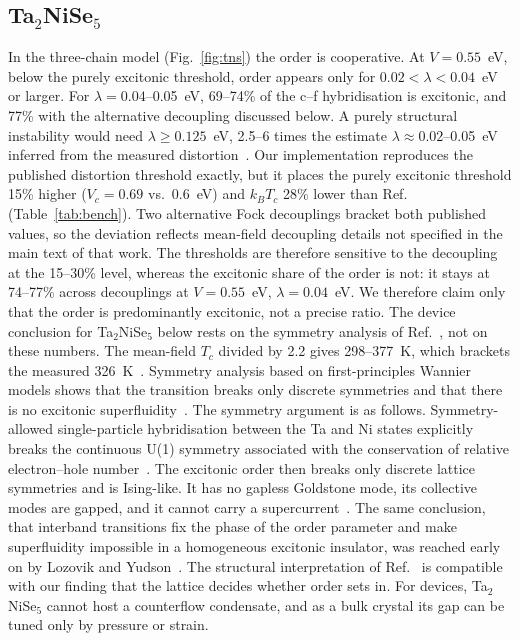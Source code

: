 \documentclass[aip,jap,reprint,amsmath,amssymb]{revtex4-2}
\begin{document}
\subsection{Ta$_2$NiSe$_5$}
In the three-chain model (Fig.~\ref{fig:tns}) the order is cooperative. At $V=0.55$~eV, below the purely excitonic threshold, order appears only for $0.02<\lambda<0.04$~eV or larger. For $\lambda=0.04$--0.05~eV, 69--74\% of the c--f hybridisation is excitonic, and 77\% with the alternative decoupling discussed below. A purely
structural instability would need $\lambda\ge0.125$~eV, 2.5--6 times the estimate $\lambda\approx0.02$--0.05~eV inferred from the measured
distortion~\cite{Kaneko2013}. Our implementation reproduces the published distortion threshold exactly, but it places the purely excitonic threshold 15\% higher ($V_c=0.69$ vs.\ 0.6~eV) and $k_BT_c$ 28\% lower than Ref.~ (Table~\ref{tab:bench}). Two alternative Fock decouplings bracket both published values, so the deviation reflects mean-field decoupling details not specified in the main text of that work. The thresholds are therefore sensitive to the decoupling at the 15--30\% level, whereas the excitonic share of the order is not: it stays at 74--77\% across decouplings at $V=0.55$~eV, $\lambda=0.04$~eV. We therefore claim only that the order is predominantly excitonic, not a precise ratio. The device conclusion for Ta$_2$NiSe$_5$ below rests on the symmetry analysis of Ref.~, not on these numbers. The mean-field $T_c$ divided by 2.2 gives 298--377~K, which brackets the measured
326~K~\cite{Lu2017}. Symmetry analysis based on first-principles Wannier models shows that the transition
breaks only discrete symmetries and that there is no excitonic superfluidity~\cite{Mazza2020}. The symmetry argument is as follows. Symmetry-allowed single-particle hybridisation between the Ta and Ni states explicitly breaks the continuous U(1) symmetry associated with the conservation of relative electron--hole number~\cite{Mazza2020}. The excitonic order then breaks only discrete lattice symmetries and is Ising-like. It has no gapless Goldstone mode, its collective modes are gapped, and it cannot carry a supercurrent~\cite{Mazza2020}. The same conclusion, that interband transitions fix the phase of the order parameter and make superfluidity impossible in a homogeneous excitonic insulator, was reached early on by Lozovik and Yudson~\cite{LozovikYudson1976}. The structural
interpretation of Ref.~ is compatible with our finding that the lattice decides
whether order sets in. For devices, Ta$_2$NiSe$_5$ cannot host a counterflow condensate, and as a bulk crystal its gap can
be tuned only by pressure or strain.
\end{document}
